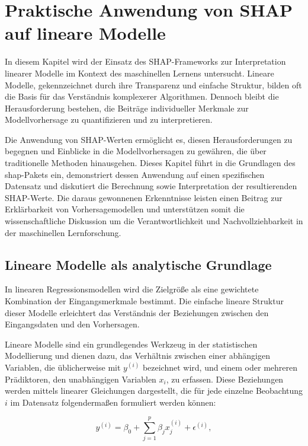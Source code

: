 \chapter{Praktische Anwendung von SHAP auf lineare Modelle}

In diesem Kapitel wird der Einsatz des SHAP-Frameworks zur Interpretation linearer Modelle im 
Kontext des maschinellen Lernens untersucht. Lineare Modelle, gekennzeichnet durch ihre Transparenz 
und einfache Struktur, bilden oft die Basis für das Verständnis komplexerer Algorithmen. 
Dennoch bleibt die Herausforderung bestehen, die Beiträge individueller Merkmale zur Modellvorhersage zu 
quantifizieren und zu interpretieren.

Die Anwendung von SHAP-Werten ermöglicht es, diesen Herausforderungen zu begegnen und Einblicke in 
die Modellvorhersagen zu gewähren, die über traditionelle Methoden hinausgehen. 
Dieses Kapitel führt in die Grundlagen des \textsf{shap}-Pakets ein, demonstriert dessen Anwendung auf einen 
spezifischen Datensatz und diskutiert die Berechnung sowie Interpretation der resultierenden SHAP-Werte. 
Die daraus gewonnenen Erkenntnisse leisten einen Beitrag zur Erklärbarkeit von Vorhersagemodellen und 
unterstützen somit die wissenschaftliche Diskussion um die Verantwortlichkeit und Nachvollziehbarkeit 
in der maschinellen Lernforschung.

\section{Lineare Modelle als analytische Grundlage}

In linearen Regressionsmodellen wird die Zielgröße als eine gewichtete Kombination der Eingangsmerkmale bestimmt. 
Die einfache lineare Struktur dieser Modelle erleichtert das Verständnis der Beziehungen zwischen den Eingangsdaten 
und den Vorhersagen. 

Lineare Modelle sind ein grundlegendes Werkzeug in der statistischen Modellierung und dienen dazu, das Verhältnis zwischen 
einer abhängigen Variablen, die üblicherweise mit $y^{(i)}$ bezeichnet wird, 
und einem oder mehreren Prädiktoren, den unabhängigen Variablen $x_i$, zu erfassen. 
Diese Beziehungen werden mittels linearer Gleichungen dargestellt, die für jede 
einzelne Beobachtung $i$ im Datensatz folgendermaßen formuliert werden können:

\begin{equation}
    y^{(i)} = \beta_0 + \sum_{j=1}^{p} \beta_j x^{(i)}_j + \epsilon^{(i)},
\end{equation}

